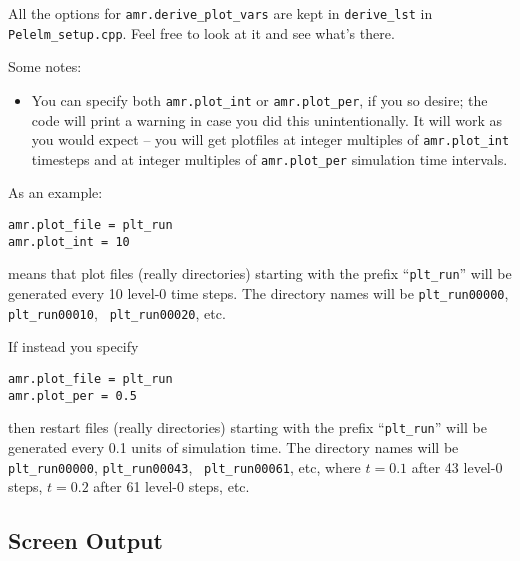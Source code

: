 All the options for {\tt amr.derive\_plot\_vars} are kept in
\texttt{derive\_lst} in {\tt Pelelm\_setup.cpp}.  Feel free to look at
it and see what's there.

Some notes:
\begin{itemize}

\item You can specify both {\tt amr.plot\_int} or {\tt amr.plot\_per},
  if you so desire; the code will print a warning in case you did this
  unintentionally. It will work as you would expect -- you will get plotfiles
  at integer multiples of {\tt amr.plot\_int} timesteps and at integer
  multiples of {\tt amr.plot\_per} simulation time intervals.

\end{itemize}


As an example:
\begin{lstlisting}
amr.plot_file = plt_run
amr.plot_int = 10
\end{lstlisting}
means that plot files (really directories) starting with the prefix
``{\tt plt\_run}'' will be generated every 10 level-0 time steps.  The
directory names will be {\tt plt\_run00000}, {\tt plt\_run00010}, {\tt
  plt\_run00020}, etc.


If instead you specify
\begin{lstlisting}
amr.plot_file = plt_run
amr.plot_per = 0.5
\end{lstlisting}
then restart files (really directories) starting with the prefix
``{\tt plt\_run}'' will be generated every 0.1 units of simulation time.  The
directory names will be {\tt plt\_run00000}, {\tt plt\_run00043}, {\tt
  plt\_run00061}, etc, where $t = 0.1$ after 43 level-0 steps, $t =
0.2$ after 61 level-0 steps, etc.



\subsection{Screen Output}

